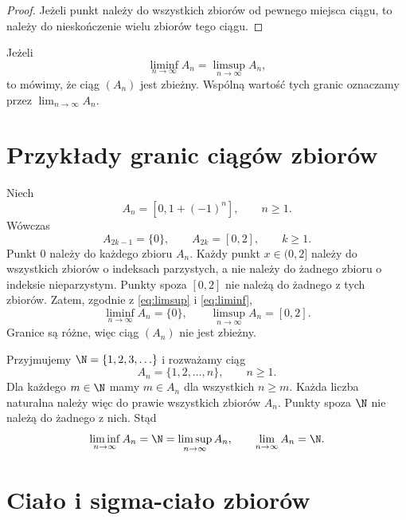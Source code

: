 \begin{proof}
Jeżeli punkt należy do wszystkich zbiorów od pewnego miejsca ciągu,
to należy do nieskończenie wielu zbiorów tego ciągu.
\end{proof}

\begin{definicja}
Jeżeli
\[
  \liminf_{n\to\infty}A_n=\limsup_{n\to\infty}A_n,
\]
to mówimy, że ciąg $(A_n)$ jest zbieżny. Wspólną wartość tych granic
oznaczamy przez $\lim_{n\to\infty}A_n$.
\end{definicja}

\section{Przykłady granic ciągów zbiorów}
\label{sec:przyklady-granic}

\begin{przyklad}
Niech
\[
  A_n=[0,1+(-1)^n],\qquad n\geq1.
\]
Wówczas
\[
  A_{2k-1}=\{0\},\qquad A_{2k}=[0,2],\qquad k\geq1.
\]
Punkt $0$ należy do każdego zbioru $A_n$. Każdy punkt $x\in(0,2]$ należy
do wszystkich zbiorów o indeksach parzystych, a nie należy do żadnego
zbioru o indeksie nieparzystym. Punkty spoza $[0,2]$ nie należą do
żadnego z tych zbiorów. Zatem, zgodnie z \eqref{eq:limsup} i \eqref{eq:liminf},
\begin{equation}
  \liminf_{n\to\infty}A_n=\{0\},\qquad
  \limsup_{n\to\infty}A_n=[0,2].
  \label{eq:przyklad-naprzemienny}
\end{equation}
Granice są różne, więc ciąg $(A_n)$ nie jest zbieżny.
\end{przyklad}

\begin{przyklad}
Przyjmujemy $\N=\{1,2,3,\ldots\}$ i rozważamy ciąg
\[
  A_n=\{1,2,\ldots,n\},\qquad n\geq1.
\]
Dla każdego $m\in\N$ mamy $m\in A_n$ dla wszystkich $n\geq m$.
Każda liczba naturalna należy więc do prawie wszystkich zbiorów $A_n$.
Punkty spoza $\N$ nie należą do żadnego z nich. Stąd
\begin{equation}
  \liminf_{n\to\infty}A_n=\N=\limsup_{n\to\infty}A_n,
  \qquad \lim_{n\to\infty}A_n=\N.
  \label{eq:przyklad-naturalne}
\end{equation}
\end{przyklad}

\section{Ciało i sigma-ciało zbiorów}
\label{sec:cialo-sigma-cialo}

